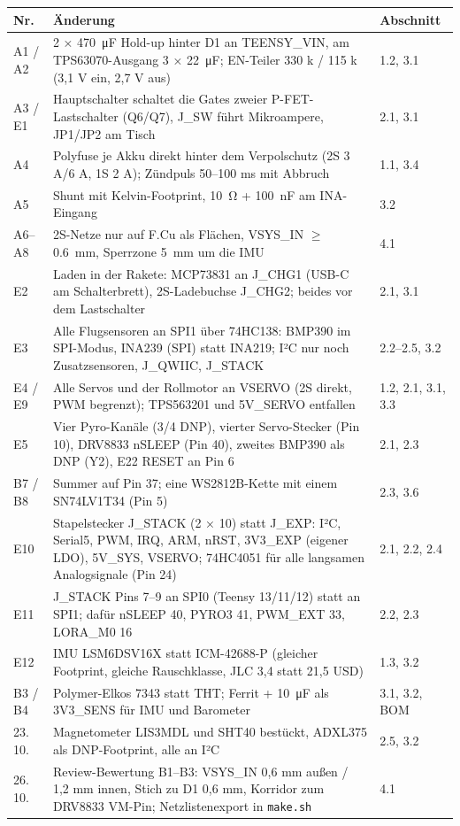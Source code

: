\documentclass[10pt,a4paper,twoside]{article}
\begin{document}
\begin{tabularx}{\textwidth}{L{14mm} X L{34mm}}
\toprule
\textbf{Nr.} & \textbf{Änderung} & \textbf{Abschnitt}\\
\midrule
A1 / A2 & 2 × \SI{470}{\micro F} Hold-up hinter D1 an TEENSY\_VIN, am TPS63070-Ausgang 3 × \SI{22}{\micro F}; EN-Teiler 330 k / 115 k (3,1 V ein, 2,7 V aus) & 1.2, 3.1\\
A3 / E1 & Hauptschalter schaltet die Gates zweier P-FET-Lastschalter (Q6/Q7), J\_SW führt Mikroampere, JP1/JP2 am Tisch & 2.1, 3.1\\
A4 & Polyfuse je Akku direkt hinter dem Verpolschutz (2S 3 A/6 A, 1S 2 A); Zündpuls 50--100 ms mit Abbruch & 1.1, 3.4\\
A5 & Shunt mit Kelvin-Footprint, \SI{10}{\ohm} + \SI{100}{nF} am INA-Eingang & 3.2\\
A6--A8 & 2S-Netze nur auf F.Cu als Flächen, VSYS\_IN $\ge$ \SI{0.6}{mm}, Sperrzone \SI{5}{mm} um die IMU & 4.1\\
E2 & Laden in der Rakete: MCP73831 an J\_CHG1 (USB-C am Schalterbrett), 2S-Ladebuchse J\_CHG2; beides vor dem Lastschalter & 2.1, 3.1\\
E3 & Alle Flugsensoren an SPI1 über 74HC138: BMP390 im SPI-Modus, INA239 (SPI) statt INA219; I²C nur noch Zusatzsensoren, J\_QWIIC, J\_STACK & 2.2--2.5, 3.2\\
E4 / E9 & Alle Servos und der Rollmotor an VSERVO (2S direkt, PWM begrenzt); TPS563201 und 5V\_SERVO entfallen & 1.2, 2.1, 3.1, 3.3\\
E5 & Vier Pyro-Kanäle (3/4 DNP), vierter Servo-Stecker (Pin 10), DRV8833 nSLEEP (Pin 40), zweites BMP390 als DNP (Y2), E22 RESET an Pin 6 & 2.1, 2.3\\
B7 / B8 & Summer auf Pin 37; eine WS2812B-Kette mit einem SN74LV1T34 (Pin 5) & 2.3, 3.6\\
E10 & Stapelstecker J\_STACK (2 × 10) statt J\_EXP: I²C, Serial5, PWM, IRQ, ARM, nRST, 3V3\_EXP (eigener LDO), 5V\_SYS, VSERVO; 74HC4051 für alle langsamen Analogsignale (Pin 24) & 2.1, 2.2, 2.4\\
E11 & J\_STACK Pins 7--9 an SPI0 (Teensy 13/11/12) statt an SPI1; dafür nSLEEP 40, PYRO3 41, PWM\_EXT 33, LORA\_M0 16 & 2.2, 2.3\\
E12 & IMU LSM6DSV16X statt ICM-42688-P (gleicher Footprint, gleiche Rauschklasse, JLC 3,4 statt 21,5 USD) & 1.3, 3.2\\
B3 / B4 & Polymer-Elkos 7343 statt THT; Ferrit + \SI{10}{\micro F} als 3V3\_SENS für IMU und Barometer & 3.1, 3.2, BOM\\
23.\,10. & Magnetometer LIS3MDL und SHT40 bestückt, ADXL375 als DNP-Footprint, alle an I²C & 2.5, 3.2\\
26.\,10. & Review-Bewertung B1--B3: VSYS\_IN 0,6 mm außen / 1,2 mm innen, Stich zu D1 0,6 mm, Korridor zum DRV8833 VM-Pin; Netzlistenexport in \texttt{make.sh} & 4.1\\
\bottomrule
\end{tabularx}
\end{document}
